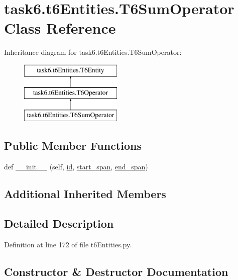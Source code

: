 \hypertarget{classtask6_1_1t6Entities_1_1T6SumOperator}{}\section{task6.\+t6\+Entities.\+T6\+Sum\+Operator Class Reference}
\label{classtask6_1_1t6Entities_1_1T6SumOperator}
Inheritance diagram for task6.\+t6\+Entities.\+T6\+Sum\+Operator\+:\begin{figure}[H]
\begin{center}
\leavevmode
\includegraphics[height=3.000000cm]{classtask6_1_1t6Entities_1_1T6SumOperator}
\end{center}
\end{figure}
\subsection*{Public Member Functions}
\begin{DoxyCompactItemize}
\item 
def \hyperlink{classtask6_1_1t6Entities_1_1T6SumOperator_aa25af851f88d2574f2012834b7c86e81}{\+\_\+\+\_\+init\+\_\+\+\_\+} (self, \hyperlink{classtask6_1_1t6Entities_1_1T6Entity_afeeced8134bb3ebe0cfecc64d0ab46a4}{id}, \hyperlink{classtask6_1_1t6Entities_1_1T6Entity_a52779e9af8864dc98e8b02fc5b9b041a}{start\+\_\+span}, \hyperlink{classtask6_1_1t6Entities_1_1T6Entity_aeb402200b156cd9562c5111dfe777b98}{end\+\_\+span})
\end{DoxyCompactItemize}
\subsection*{Additional Inherited Members}


\subsection{Detailed Description}


Definition at line 172 of file t6\+Entities.\+py.



\subsection{Constructor \& Destructor Documentation}
\mbox{\label{classtask6_1_1t6Entities_1_1T6SumOperator_aa25af851f88d2574f2012834b7c86e81}} 
